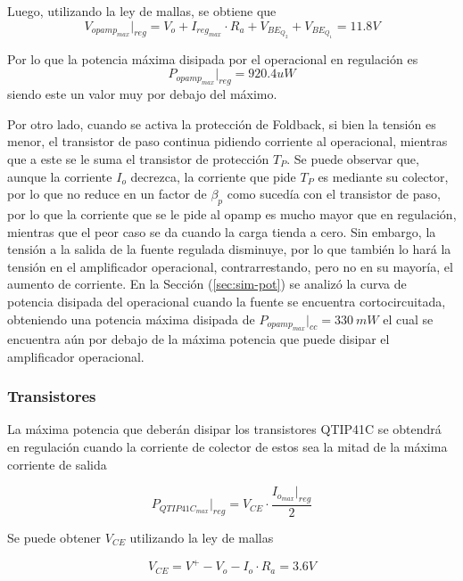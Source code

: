 Luego, utilizando la ley de mallas, se obtiene que
\begin{equation}
	V_{opamp_{max}}|_{reg} = V_o + I_{reg_{max}} \cdot R_a + V_{BE_{Q_2}} + V_{BE_{Q_1}} = 11.8V
\end{equation}

Por lo que la potencia máxima disipada por el operacional en regulación es
\begin{equation}
	P_{opamp_{max}}|_{reg} = 920.4uW
\end{equation}
siendo este un valor muy por debajo del máximo.

Por otro lado, cuando se activa la protección de Foldback, si bien la tensión es menor, el transistor de paso continua pidiendo corriente al operacional, mientras que a este se le suma el transistor de protección $T_P$. Se puede observar que, aunque la corriente $I_o$ decrezca, la corriente que pide $T_P$ es mediante su colector, por lo que no reduce en un factor de $\beta_p$ como sucedía con el transistor de paso, por lo que la corriente que se le pide al opamp es mucho mayor que en regulación, mientras que el peor caso se da cuando la carga tienda a cero. Sin embargo, la tensión a la salida de la fuente regulada disminuye, por lo que también lo hará la tensión en el amplificador operacional, contrarrestando, pero no en su mayoría, el aumento de corriente. En la Sección (\ref{sec:sim-pot}) se analizó la curva de potencia disipada del operacional cuando la fuente se encuentra cortocircuitada, obteniendo una potencia máxima disipada de $P_{opamp_{max}}|_{cc} = 330 \ mW$ el cual se encuentra aún por debajo de la máxima potencia que puede disipar el amplificador operacional.

\subsubsection{Transistores}

La máxima potencia que deberán disipar los transistores QTIP41C se obtendrá en regulación cuando la corriente de colector de estos sea la mitad de la máxima corriente de salida

\begin{equation}
P_{QTIP41C_{max}}|_{reg} = V_{CE}\cdot \frac{I_{o_{max}}|_{reg}}{2}
\end{equation}

Se puede obtener  $V_{CE}$ utilizando la ley de mallas

\begin{equation}
V_{CE} = V^+ - V_o - I_o\cdot R_a = 3.6V
\end{equation}

